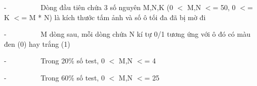 -          Dòng đầu tiên chứa 3 số nguyên M,N,K (0 $<$ M,N $<$= 50, 0 $<$= K $<$= M * N) là kích thước tấm ảnh và số ô tối đa đã bị mờ đi

-          M dòng sau, mỗi dòng chứa N kí tự 0/1 tương ứng với ô đó có màu đen (0) hay trắng (1)

-          Trong 20\% số test, 0 $<$ M,N $<$= 4

-          Trong 60\% số test, 0 $<$ M,N $<$= 25